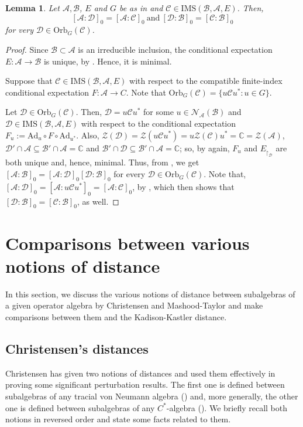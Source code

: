 \documentclass{amsart}
\numberwithin{equation}{section}
\newcommand{\IMS}{\mathrm{IMS}}
\newcommand{\C}{\mathbb C}
\newcommand{\1}{\mathbf{1}}
\newcommand{\mA}{\mathcal{A}}
\newcommand{\mB}{\mathcal{B}}
\newcommand{\mC}{\mathcal{C}}
\newcommand{\mD}{\mathcal{D}}
\newcommand{\mZ}{\mathcal{Z}}
\newcommand{\mN}{\mathcal{N}}
\newtheorem{lemma}[theorem]{Lemma}
\begin{document}
\begin{lemma}
Let $\mA, \mB$, $E$ and $G$ be as in 
and $\mC\in \IMS(\mB, \mA, E)$. Then,
\[
[\mA:\mD]_{0}= [\mA : \mC]_{0}\ \text{and} \
[\mD:\mB]_{0}= [\mC : \mB]_{0}
\]
for very $\mD \in \mathrm{Orb}_G(\mC)$.
 \end{lemma}

\begin{proof}
  Since $\mB\subset \mA$ is an irreducible inclusion, the conditional
  expectation $E:\mA  \rightarrow \mB$ is unique, by \cite[Corollary
    1.4.3]{Wat}. Hence, it is minimal.

  Suppose that $\mC\in \IMS(\mB, \mA, E)$ with respect to the
  compatible finite-index conditional expectation $F: \mA\rightarrow
  C$. Note that $\mathrm{Orb}_G(\mC) =
  \{ u \mC u^* : u \in G\}$.

Let $\mD \in \mathrm{Orb}_G(\mC)$. Then, $\mD = u \mC u^*$ for some $u
\in \mN_{\mA}(\mB)$ and $\mD \in \IMS(\mB, \mA, E)$ with respect to
the conditional expectation $F_u:=\mathrm{Ad}_u \circ F \circ
\mathrm{Ad}_{u^*}$. Also, $\mZ(\mD)= \mZ(u \mC u^*) = u\mZ(\mC)u^* = \C =
\mZ(\mA)$, $\mD{'}\cap \mA \subseteq \mB{'}\cap \mA =\C$ and
$\mB{'}\cap \mD \subseteq \mB{'}\cap \mA=\C$; so, by \cite[Corollary
  1.4.3]{Wat} again, $F_u$ and $E_{\restriction_{\mD}}$ are both
unique and, hence, minimal. Thus, from \cite[Theorem 3]{KW}, we get \(
[\mA:\mB]_0=[\mA: \mD]_0[\mD:\mB]_0 \) for every $\mD \in
\mathrm{Orb}_G(\mC)$. Note that, $[\mA: \mD]_{0} = [\mA: u\mC u^*]_{0} =
       [\mA: \mC]_0$, by \cite[Lemma 2.8]{GS}, which then shows that
       \( [\mD :\mB]_{0}= [\mC: \mB]_{0}\), as well.
\end{proof}


\section{Comparisons between various notions of distance}
\label{comparisons}

In this section, we discuss the various notions of distance between
subalgebras of a given operator algebra by Christensen and
Mashood-Taylor and make comparisons between them and the
Kadison-Kastler distance.

\subsection{Christensen's  distances}

Christensen has given two notions of distances and used them
effectively in proving some significant perturbation results.  The
first one is defined between subalgebras of any tracial von Neumann
algebra (\cite{Ch1}) and, more generally, the other one is
defined between subalgebras of any $C^*$-algebra (\cite{Ch2}). We
briefly recall both notions in reversed order and state some facts
related to them.
\end{document}
